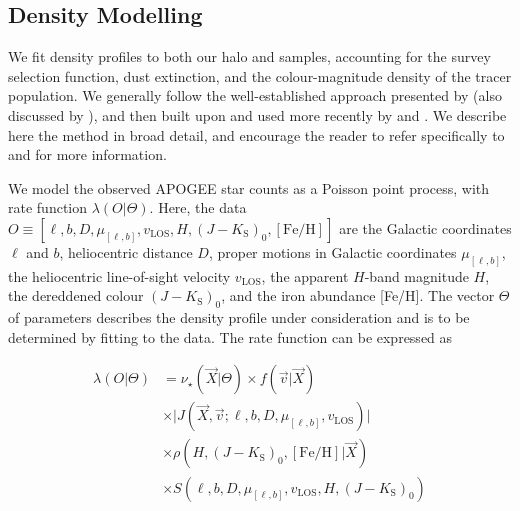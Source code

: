\subsection{Density Modelling}

We fit density profiles to both our halo and \gse samples, accounting for the survey selection function, dust extinction, and the colour-magnitude density of the tracer population. We generally follow the well-established approach presented by \textcite{bovy12} (also discussed by \textcite{rix13}), and then built upon and used more recently by \textcite{bovy16a,bovy16b,mackereth17,horta21b} and \cite{mackereth20}. We describe here the method in broad detail, and encourage the reader to refer specifically to \textcite{bovy12,bovy16a} and \cite{mackereth20} for more information.

We model the observed APOGEE star counts as a Poisson point process, with rate function $\lambda(O \vert \Theta)$. Here, the data $O \equiv [\ell, b, D, \mu_{[\ell,b]}, v_\mathrm{LOS}, H, (J-K_\mathrm{S})_{0}, [\mathrm{Fe/H}]]$ are the Galactic coordinates $\ell$ and $b$, heliocentric distance $D$, proper motions in Galactic coordinates $\mu_{[\ell,b]}$, the heliocentric line-of-sight velocity $v_\mathrm{LOS}$, the apparent $H$-band magnitude $H$, the dereddened colour $(J-K_\mathrm{S})_{0}$, and the iron abundance [Fe/H]. The vector $\Theta$ of parameters describes the density profile under consideration and is to be determined by fitting to the data. The rate function can be expressed as

\begin{equation}
\label{eq:rate}
\begin{split}
	\lambda(O \vert \Theta) & = \nu_{\star}(\vec{X} \vert \Theta) \times f(\vec{v} \vert \vec{X}) \\
	& \times \vert J(\vec{X}, \vec{v}; \ell, b, D, \mu_{[\ell,b]}, v_\mathrm{LOS}) \vert \\
	& \times \rho(H, (J-K_\mathrm{S})_{0}, [\mathrm{Fe/H}] \vert \vec{X}) \\
	& \times S(\ell, b, D, \mu_{[\ell,b]}, v_\mathrm{LOS}, H, (J-K_\mathrm{S})_{0})
\end{split}
\end{equation}

